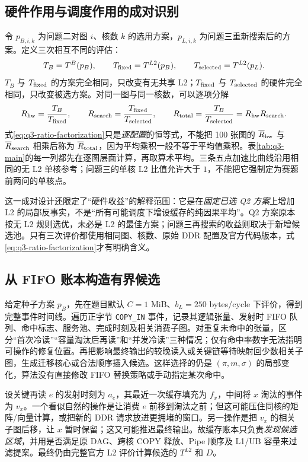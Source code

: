 \subsection{硬件作用与调度作用的成对识别}
令 $p_{B,i,k}$ 为问题二对图 $i$、核数 $k$ 的选用方案，$p_{L,i,k}$ 为问题三重新搜索后的方案。定义三次相互不同的评估：
\begin{equation}\label{eq:q3-three-evaluations}
T_B=T^B(p_B),\qquad
T_{\rm fixed}=T^{L2}(p_B),\qquad
T_{\rm selected}=T^{L2}(p_L).
\end{equation}
$T_B$ 与 $T_{\rm fixed}$ 的方案完全相同，只改变有无共享 L2；$T_{\rm fixed}$ 与 $T_{\rm selected}$ 的硬件完全相同，只改变被选方案。对同一图与同一核数，可以逐项分解
\begin{equation}\label{eq:q3-ratio-factorization}
R_{\rm hw}=\frac{T_B}{T_{\rm fixed}},\qquad
R_{\rm search}=\frac{T_{\rm fixed}}{T_{\rm selected}},\qquad
R_{\rm total}=\frac{T_B}{T_{\rm selected}}
=R_{\rm hw}R_{\rm search}.
\end{equation}
式\eqref{eq:q3-ratio-factorization}只是\emph{逐配置}的恒等式，不能把 100 张图的 $\overline R_{\rm hw}$ 与 $\overline R_{\rm search}$ 相乘后称为 $\overline R_{\rm total}$，因为平均乘积一般不等于平均值乘积。表\ref{tab:q3-main}的每一列都先在逐图层面计算，再取算术平均。三条五点加速比曲线沿用相同的无 L2 单核参考；问题三的单核 L2 比值允许大于 $1$，不能把它强制定为赛题前两问的单核点。

这一成对设计还限定了“硬件收益”的解释范围：它是在\emph{固定已选 Q2 方案}上增加 L2 的局部反事实，不是“所有可能调度下增设缓存的纯因果平均”。Q2 方案原本按无 L2 规则选优，未必是 L2 的最佳方案；问题三再搜索的收益则取决于新增候选池。只有三次评价都使用相同图、核数、原始 DDR 配置及官方代码版本，式\eqref{eq:q3-ratio-factorization}才有明确含义。

\subsection{从 FIFO 账本构造有界候选}
给定种子方案 $p_B$，先在题目默认 $C=1$ MiB、$b_L=250$ bytes/cycle 下评价，得到完整事件时间线。遍历正字节 \texttt{COPY\_IN} 事件，记录其逻辑张量、发射时 FIFO 队列、命中标志、服务池、完成时刻及相关消费子图。对重复未命中的张量，区分“首次冷读”“容量淘汰后再读”和“并发冷读”三种情况；仅有命中率数字无法指明可操作的修复位置。再把影响最终输出的较晚读入或关键链等待映射回少数相关子图，生成迁移核心或合法顺序插入候选。这样选择的仍是 $(\pi,m,\sigma)$ 的局部变化，算法没有直接修改 FIFO 替换策略或手动指定某次命中。

设关键再读 $e$ 的发射时刻为 $a_e$，其最近一次缓存填充为 $f_x$，中间将 $x$ 淘汰的事件为 $v_x$。一个看似自然的操作是让消费 $e$ 前移到淘汰之前；但这可能压住同核的矩阵/向量计算，或把新的 DDR 请求放进更拥堵的窗口。另一操作是把 $v_x$ 的相关子图后移，让 $x$ 暂时保留；这又可能推迟最终输出。故缓存账本只负责\emph{发现候选区域}，并用是否满足原 DAG、跨核 COPY 释放、Pipe 顺序及 L1/UB 容量来过滤提案。最终仍由完整官方 L2 评价计算候选的 $T^{L2}$ 和 $D$。


